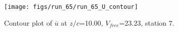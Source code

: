 \begin{figure}[H]
\centering
\texttt{[image: figs/run\_65/run\_65\_U\_contour]}
\caption{Contour plot of $\overline{u}$ at $z/c$=10.00, $V_{free}$=23.23, station 7.}
\label{fig:run_65_U_contour}
\end{figure}


